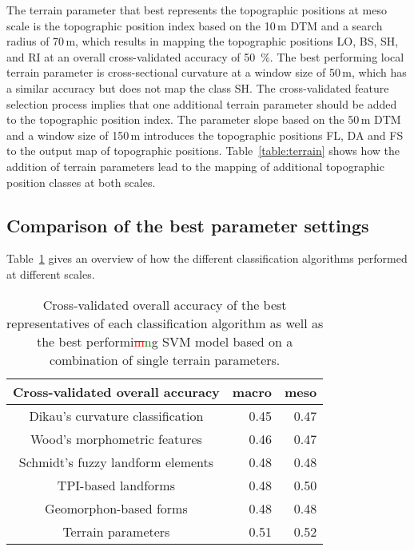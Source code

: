 \documentclass[preprint,12pt,authoryear]{elsarticle}
\begin{document}
The terrain parameter that best represents the topographic positions at meso scale is the topographic position index based on the 10\,m DTM and a search radius of 70\,m, which results in mapping the topographic positions LO, BS, SH, and RI at an overall cross-validated accuracy of 50~\%. The best performing local terrain parameter is cross-sectional curvature at a window size of 50\,m, which has a similar accuracy but does not map the class SH. The cross-validated feature selection process implies that one additional terrain parameter should be added to the topographic position index. The parameter slope based on the 50\,m DTM and a window size of 150\,m introduces the topographic positions FL, DA and FS to the output map of topographic positions. Table~\ref{table:terrain} shows how the addition of terrain parameters lead to the mapping of additional topographic position classes at both scales.

\subsection{Comparison of the best parameter settings}
Table~\ref{table:overall_comparison} gives an overview of how the different classification algorithms performed at different scales.

\begin{table}[ht]
\caption{Cross-validated overall accuracy of the best representatives of each classification algorithm as well as the best performi\textcolor{red}{\sout{m}}\textcolor{green}{n}g SVM model based on a combination of single terrain parameters.}
\centering
\begin{tabular}{crr}
  \hline
Cross-validated overall accuracy & macro   & meso \\ 
  \hline 
Dikau's curvature classification & 0.45  & 0.47 \\ 
  Wood's morphometric features & 0.46  & 0.47  \\ 
  Schmidt's fuzzy landform elements & 0.48   & 0.48  \\ 
  TPI-based landforms & 0.48  & 0.50  \\ 
  Geomorphon-based forms & 0.48   & 0.48   \\ 
  Terrain parameters & 0.51  & 0.52   \\ 
   \hline
\end{tabular}
\label{table:overall_comparison}
\end{table}
\end{document}
